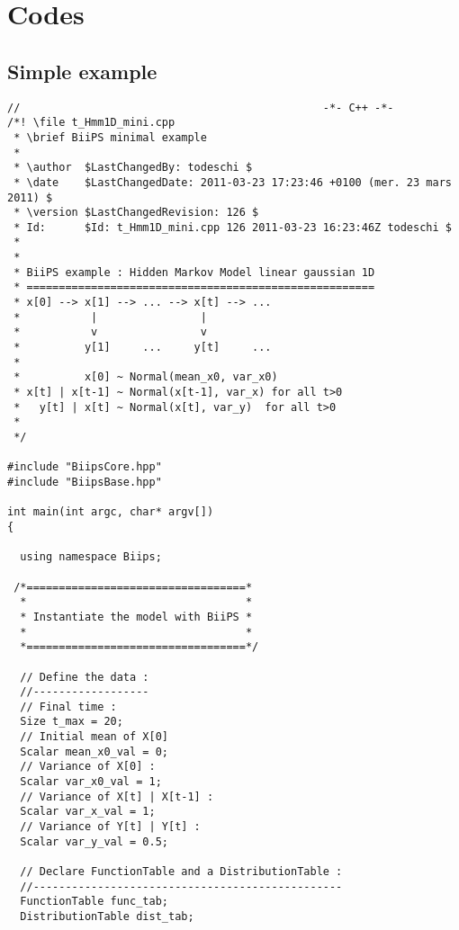 \chapter{Codes}

\section{Simple example}
\label{miniex}


\begin{lstlisting}
//                                               -*- C++ -*-
/*! \file t_Hmm1D_mini.cpp
 * \brief BiiPS minimal example
 * 
 * \author  $LastChangedBy: todeschi $
 * \date    $LastChangedDate: 2011-03-23 17:23:46 +0100 (mer. 23 mars 2011) $
 * \version $LastChangedRevision: 126 $
 * Id:      $Id: t_Hmm1D_mini.cpp 126 2011-03-23 16:23:46Z todeschi $
 *
 *
 * BiiPS example : Hidden Markov Model linear gaussian 1D
 * ======================================================
 * x[0] --> x[1] --> ... --> x[t] --> ...
 *           |                |
 *           v                v
 *          y[1]     ...     y[t]     ...
 *
 *          x[0] ~ Normal(mean_x0, var_x0)
 * x[t] | x[t-1] ~ Normal(x[t-1], var_x) for all t>0
 *   y[t] | x[t] ~ Normal(x[t], var_y)  for all t>0
 *
 */

#include "BiipsCore.hpp"
#include "BiipsBase.hpp"

int main(int argc, char* argv[])
{

  using namespace Biips;

 /*==================================*
  *                                  *
  * Instantiate the model with BiiPS *
  *                                  *
  *==================================*/

  // Define the data :
  //------------------
  // Final time :
  Size t_max = 20;
  // Initial mean of X[0]
  Scalar mean_x0_val = 0;
  // Variance of X[0] :
  Scalar var_x0_val = 1;
  // Variance of X[t] | X[t-1] :
  Scalar var_x_val = 1;
  // Variance of Y[t] | Y[t] :
  Scalar var_y_val = 0.5;

  // Declare FunctionTable and a DistributionTable :
  //------------------------------------------------
  FunctionTable func_tab;
  DistributionTable dist_tab;


\end{lstlisting}
